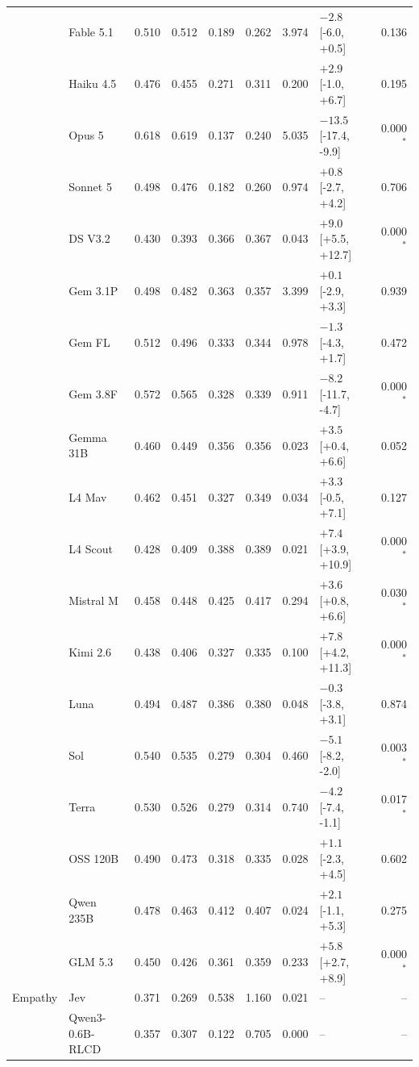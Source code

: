 \begin{longtable}{llrrrrrlr}
 & Fable 5.1 & 0.510 & 0.512 & 0.189 & 0.262 & 3.974 & $-2.8$ [-6.0, +0.5] & 0.136 \\
 & Haiku 4.5 & 0.476 & 0.455 & 0.271 & 0.311 & 0.200 & $+2.9$ [-1.0, +6.7] & 0.195 \\
 & Opus 5 & 0.618 & 0.619 & 0.137 & 0.240 & 5.035 & $-13.5$ [-17.4, -9.9] & 0.000$^{*}$ \\
 & Sonnet 5 & 0.498 & 0.476 & 0.182 & 0.260 & 0.974 & $+0.8$ [-2.7, +4.2] & 0.706 \\
 & DS V3.2 & 0.430 & 0.393 & 0.366 & 0.367 & 0.043 & $+9.0$ [+5.5, +12.7] & 0.000$^{*}$ \\
 & Gem 3.1P & 0.498 & 0.482 & 0.363 & 0.357 & 3.399 & $+0.1$ [-2.9, +3.3] & 0.939 \\
 & Gem FL & 0.512 & 0.496 & 0.333 & 0.344 & 0.978 & $-1.3$ [-4.3, +1.7] & 0.472 \\
 & Gem 3.8F & 0.572 & 0.565 & 0.328 & 0.339 & 0.911 & $-8.2$ [-11.7, -4.7] & 0.000$^{*}$ \\
 & Gemma 31B & 0.460 & 0.449 & 0.356 & 0.356 & 0.023 & $+3.5$ [+0.4, +6.6] & 0.052 \\
 & L4 Mav & 0.462 & 0.451 & 0.327 & 0.349 & 0.034 & $+3.3$ [-0.5, +7.1] & 0.127 \\
 & L4 Scout & 0.428 & 0.409 & 0.388 & 0.389 & 0.021 & $+7.4$ [+3.9, +10.9] & 0.000$^{*}$ \\
 & Mistral M & 0.458 & 0.448 & 0.425 & 0.417 & 0.294 & $+3.6$ [+0.8, +6.6] & 0.030$^{*}$ \\
 & Kimi 2.6 & 0.438 & 0.406 & 0.327 & 0.335 & 0.100 & $+7.8$ [+4.2, +11.3] & 0.000$^{*}$ \\
 & Luna & 0.494 & 0.487 & 0.386 & 0.380 & 0.048 & $-0.3$ [-3.8, +3.1] & 0.874 \\
 & Sol & 0.540 & 0.535 & 0.279 & 0.304 & 0.460 & $-5.1$ [-8.2, -2.0] & 0.003$^{*}$ \\
 & Terra & 0.530 & 0.526 & 0.279 & 0.314 & 0.740 & $-4.2$ [-7.4, -1.1] & 0.017$^{*}$ \\
 & OSS 120B & 0.490 & 0.473 & 0.318 & 0.335 & 0.028 & $+1.1$ [-2.3, +4.5] & 0.602 \\
 & Qwen 235B & 0.478 & 0.463 & 0.412 & 0.407 & 0.024 & $+2.1$ [-1.1, +5.3] & 0.275 \\
 & GLM 5.3 & 0.450 & 0.426 & 0.361 & 0.359 & 0.233 & $+5.8$ [+2.7, +8.9] & 0.000$^{*}$ \\
\midrule
Empathy & Jev & 0.371 & 0.269 & 0.538 & 1.160 & 0.021 & -- & -- \\
 & Qwen3-0.6B-RLCD & 0.357 & 0.307 & 0.122 & 0.705 & 0.000 & -- & -- \\

\end{longtable}
